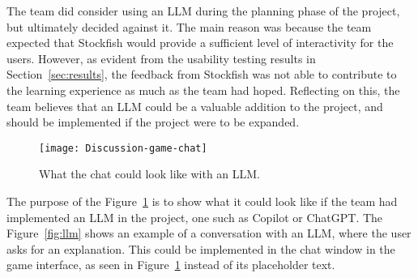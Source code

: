 The team did consider using an LLM during the planning phase of the project, but ultimately decided against it.
The main reason was because the team expected that Stockfish would provide a sufficient level of interactivity for the
users.
However, as evident from the usability testing results in Section~\ref{sec:results}, the feedback from Stockfish was
not able to contribute to the learning experience as much as the team had hoped.
Reflecting on this, the team believes that an LLM could be a valuable addition to the project, and should be implemented
if the project were to be expanded.

\begin{figure}[H]
    \centering
    \texttt{[image: Discussion-game-chat]}
    \caption{What the chat could look like with an LLM.}\label{fig:Discussion-game-chat}
\end{figure}

The purpose of the Figure~\ref{fig:Discussion-game-chat} is
to show what it could look like if the team had implemented an LLM in the project, one such as Copilot or ChatGPT\@.
The Figure~\ref{fig:llm} shows an example of a conversation with an LLM, where the user asks for an explanation.
This could be implemented in the chat window in the game interface, as seen in Figure~\ref{fig:Discussion-game-chat}
instead of its placeholder text.
